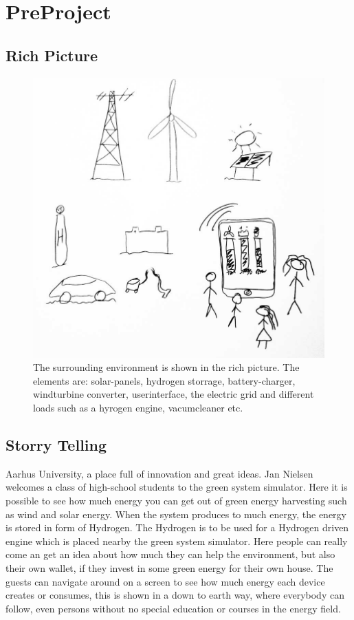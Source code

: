 \section{PreProject}
\subsection{Rich Picture}

\begin{figure}[h!]		%
 \begin{centering}
  \includegraphics[width=1\textwidth]{images/rich_picture1.png}
   \caption{The surrounding environment is shown in the rich picture. The
 			 elements are: solar-panels, hydrogen storrage, battery-charger, windturbine
 			 converter, userinterface, the electric grid and different loads such as a
 			 hyrogen engine, vacumcleaner etc. }
 \end{centering}
\end{figure}

\subsection{Storry Telling}
Aarhus University, a place full of innovation and great ideas. Jan Nielsen
welcomes a class of high-school students to the green system simulator. Here it
is possible to see how much energy you can get out of green energy harvesting
such as wind and solar energy. When the system produces to much energy, the 
energy is stored in form of Hydrogen. The Hydrogen is to be used for a Hydrogen
driven engine which is placed nearby the green system simulator. Here people can
really come an get an idea about how much they can help the environment, but
also their own wallet, if they invest in some green energy for their own house.
The guests can navigate around on a screen to see how much energy each device 
creates or consumes, this is shown in a down to earth way, where everybody can follow, 
even persons without no special education or courses in the energy field.
